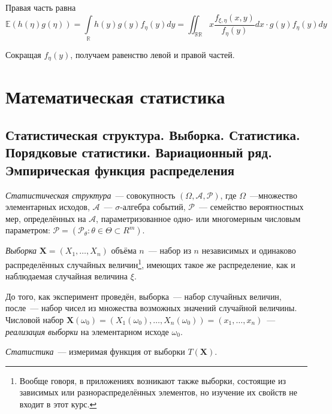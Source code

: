     Правая часть равна
    \begin{equation*}
        \mathbb{E}(h(\eta) g(\eta))=\int\limits_{\mathbb{R}} h(y) g(y) f_{\eta}(y) d y=\iint_{\mathbb{R} \mathbb{R}} x \frac{f_{\xi, \eta}(x, y)}{f_{\eta}(y)} d x \cdot g(y) f_{\eta}(y) d y
    \end{equation*}
    
    Сокращая $f_{\eta}(y)$, получаем равенство левой и правой частей.

\chapter{Математическая статистика}

\section{Статистическая структура. Выборка. Статистика. Порядковые статистики. Вариационный ряд. Эмпирическая функция распределения}

\begin{defn}
{\it Статистическая структура}~--- совокупность $(\Omega, \mathcal{A}, \mathcal{P})$, где $\Omega$~---множество элементарных исходов, $\mathcal{A}$~--- $\sigma$-алгебра событий, $\mathcal{P}$~--- семейство вероятностных мер, определённых на $\mathcal{A}$, параметризованное одно- или многомерным числовым параметром: $\mathcal{P} = (\mathcal{P}_{\theta}:\theta \in \Theta \subset R^{m})$.
\end{defn}

\begin{defn}
{\it Выборка} $\mathbf{X} = (X_{1}, \ldots, X_{n})$ объёма $n$~--- набор из $n$ независимых и одинаково распределённых случайных величин\footnote{Вообще говоря, в приложениях возникают также выборки, состоящие из зависимых или разнораспределённых элементов, но изучение их свойств не входит в этот курс.}, имеющих такое же распределение, как и наблюдаемая случайная величина $\xi$.

\end{defn}

До того, как эксперимент проведён, выборка~--- набор случайных величин, после~--- набор чисел из множества возможных значений случайной величины. Числовой набор $\mathbf{X}(\omega_0) = (X_{1}(\omega_0), \ldots, X_{n}(\omega_0)) = (x_1, \ldots, x_n)$~--- {\it реализация выборки} на элементарном исходе $\omega_0$.

\begin{defn}
{\it Статистика}~--- измеримая функция от выборки $T(\mathbf{X})$.
\end{defn}

